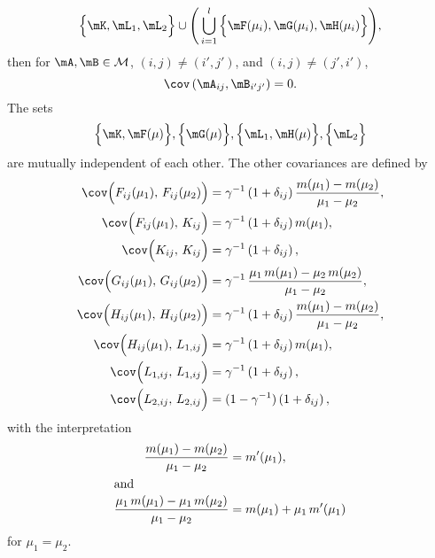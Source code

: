 \begin{lemma}
\[        \Big\{ \mK, \mL_1, \mL_2 \Big\}
        \cup
        \Bigg(
        \bigcup_{i=1}^l
            \Big\{ 
                \mF(\mu_i), \mG(\mu_i), \mH(\mu_i)
            \Big\}
        \Bigg),
    \] 
    then for $\mA, \mB \in \mathcal{M}$, $(i,j) \neq (i',j')$, and 
    $(i,j) \neq (j',i')$,
    \[
        \cov\left( \mA_{ij}, \mB_{i'j'} \right)
        =
        0.
    \]
    The sets
    \[
        \Big\{ \mK, \mF( \mu ) \Big\},
        \Big\{ \mG( \mu) \Big\},
        \Big\{ \mL_1, \mH( \mu )\Big\},
        \Big\{ \mL_2 \Big\}
    \]
    are mutually independent of each other.
    The other covariances are defined by
    \begin{align*}
        \cov\Big( F_{ij}(\mu_1), \, F_{ij}(\mu_2) \Big)
            &= \gamma^{-1}
               \left( 1 + \delta_{ij} \right)
               \frac{ m(\mu_1) - m(\mu_2) }
                    { \mu_1 - \mu_2 }, \\
        \cov\Big( F_{ij}(\mu_1), \, K_{ij} \Big)
            &= \gamma^{-1}
               \left( 1 + \delta_{ij} \right) m(\mu_1), \\
        \cov\Big( K_{ij}, \, K_{ij} \Big)
            &= \gamma^{-1}
               \left( 1 + \delta_{ij} \right), \\
        \cov\Big( G_{ij}(\mu_1), \, G_{ij}(\mu_2) \Big)
            &= \gamma^{-1} \,
               \frac{ \mu_1 \, m(\mu_1) - \mu_2 \, m(\mu_2) }
                    { \mu_1 - \mu_2 }, \\
        \cov\Big( H_{ij}(\mu_1), \, H_{ij}(\mu_2) \Big)
            &= \gamma^{-1}
               \left( 1 + \delta_{ij} \right)
               \frac{ m(\mu_1) - m(\mu_2) }
                    { \mu_1 - \mu_2 }, \\
        \cov\Big( H_{ij}(\mu_1), \, L_{1,ij} \Big)
            &= \gamma^{-1}
               \left( 1 + \delta_{ij} \right) m(\mu_1), \\
        \cov\Big( L_{1,ij}, \, L_{1,ij} \Big)
            &= \gamma^{-1}
               \left( 1 + \delta_{ij} \right), \\
        \cov\Big( L_{2,ij}, \, L_{2,ij} \Big)
            &= (1 - \gamma^{-1})
               \left( 1 + \delta_{ij} \right),
    \end{align*}
    with the interpretation
    \begin{align*}
        \frac{ m(\mu_1) - m(\mu_2) }
             { \mu_1 - \mu_2 }
            &=
                m'(\mu_1), \\
    \intertext{and}
        \frac{ \mu_1 \, m(\mu_1) - \mu_1 \, m(\mu_2) }
             { \mu_1 - \mu_2 }
            &= m( \mu_1 ) + \mu_1 \, m'(\mu_1)
    \end{align*}
    for $\mu_1 = \mu_2$.
\end{lemma}
